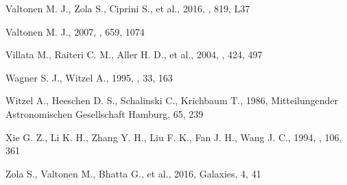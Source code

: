 \documentclass[a4paper,fleqn,usenatbib]{mnras}
\begin{document}
\begin{thebibliography}{99}
Valtonen M. J., Zola S., Ciprini S., et al., 2016, \apj, 819, L37

Valtonen M. J., 2007, \apj, 659, 1074

Villata M., Raiteri C. M., Aller H. D., et al., 2004, \aap, 424, 497

Wagner S. J., Witzel A., 1995, \araa, 33, 163

Witzel A., Heeschen D. S., Schalinski C., Krichbaum T., 1986, Mitteilungender
Astronomischen Gesellschaft Hamburg, 65, 239

Xie G. Z., Li K. H., Zhang Y. H., Liu F. K., Fan J. H., Wang J. C., 1994, \aap, 106, 361

Zola S., Valtonen M., Bhatta G., et al., 2016, Galaxies, 4, 41



\end{thebibliography}

\bsp    %
\label{lastpage}
\end{document}
